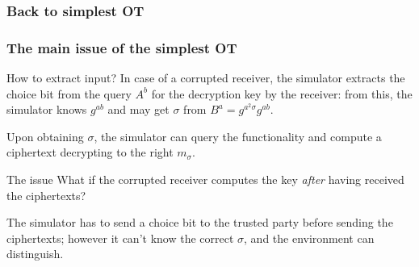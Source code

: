 \documentclass{beamer}
\begin{document}
    \begin{frame}
        \frametitle{Back to simplest OT}
        
        \begin{center}
        \end{center}
    \end{frame}

    \begin{frame}
        \frametitle{The main issue of the simplest OT}
        
        \begin{block}{How to extract input?}
            In case of a corrupted receiver, the simulator extracts the choice bit from the query $A^b$ for the decryption key by the receiver: from this, the simulator knows $g^{ab}$ and may get $\sigma$ from $B^a=g^{a^2\sigma}g^{ab}$.
            
            Upon obtaining $\sigma$, the simulator can query the functionality and compute a ciphertext decrypting to the right $m_\sigma$.
        \end{block}
    
        \pause
        \begin{alertblock}{The issue}
            What if the corrupted receiver computes the key \emph{after} having received the ciphertexts?
            
            The simulator has to send a choice bit to the trusted party before sending the ciphertexts; however it can't know the correct $\sigma$, and the environment can distinguish.
        \end{alertblock}
    \end{frame}
   
\end{document}
